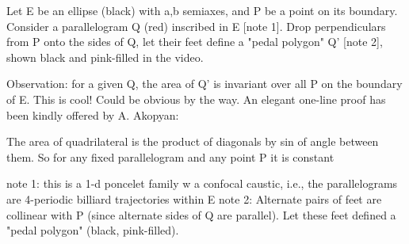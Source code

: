 Let E be an ellipse (black) with a,b semiaxes, and P be a point on its boundary. Consider a parallelogram Q (red) inscribed in E [note 1]. Drop perpendiculars from P onto the sides of Q, let their feet define a "pedal polygon"  Q' [note 2], shown black and pink-filled in the video.

Observation: for a given Q, the area of Q' is invariant over all P on the boundary of E. This is cool! Could be obvious by the way. An elegant one-line proof has been kindly offered by A. Akopyan:

The area of quadrilateral is the product of diagonals by sin of angle between them. So for any fixed parallelogram and any point P it is constant

note 1: this is a 1-d poncelet family w a confocal caustic, i.e., the parallelograms are 4-periodic billiard trajectories within E
note 2: Alternate pairs of feet are collinear with P (since alternate sides of Q are parallel). Let these feet defined a "pedal polygon"  (black, pink-filled).